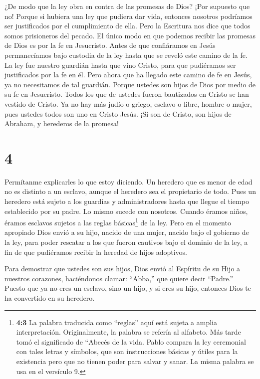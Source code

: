  ¿De modo que la ley obra en contra de las promesas de
Dios? ¡Por supuesto que no! Porque si hubiera una ley que pudiera dar
vida, entonces nosotros podríamos ser justificados por el cumplimiento
de ella.  Pero la Escritura nos dice que todos somos
prisioneros del pecado. El único modo en que podemos recibir las
promesas de Dios es por la fe en Jesucristo.  Antes de que
confiáramos en Jesús permanecíamos bajo custodia de la ley hasta que se
reveló este camino de la fe.  La ley fue nuestro guardián
hasta que vino Cristo, para que pudiéramos ser justificados por la fe en
él.  Pero ahora que ha llegado este camino de fe en Jesús,
ya no necesitamos de tal guardián.  Porque ustedes son
hijos de Dios por medio de su fe en Jesucristo.  Todos los
que de ustedes fueron bautizados en Cristo se han vestido de Cristo.
 Ya no hay más judío o griego, esclavo o libre, hombre o
mujer, pues ustedes todos son uno en Cristo Jesús.  ¡Si son
de Cristo, son hijos de Abraham, y herederos de la promesa!

\hypertarget{section-3}{%
\section{4}\label{section-3}}

 Permítanme explicarles lo que estoy diciendo. Un heredero
que es menor de edad no es distinto a un esclavo, aunque el heredero sea
el propietario de todo.  Pues un heredero está sujeto a los
guardias y administradores hasta que llegue el tiempo establecido por su
padre.  Lo mismo sucede con nosotros. Cuando éramos niños,
éramos esclavos sujetos a las reglas básicas\footnote{\textbf{4:3} La
  palabra traducida como ``reglas'' aquí está sujeta a amplia
  interpretación. Originalmente, la palabra se refería al alfabeto. Más
  tarde tomó el significado de ``Abecés de la vida. Pablo compara la ley
  ceremonial con tales letras y símbolos, que son instrucciones básicas
  y útiles para la existencia pero que no tienen poder para salvar y
  sanar. La misma palabra se usa en el versículo 9.} de la ley.
 Pero en el momento apropiado Dios envió a su hijo, nacido
de una mujer, nacido bajo el gobierno de la ley,  para poder
rescatar a los que fueron cautivos bajo el dominio de la ley, a fin de
que pudiéramos recibir la heredad de hijos adoptivos.

 Para demostrar que ustedes son sus hijos, Dios envió al
Espíritu de su Hijo a nuestros corazones, haciéndonos clamar: ``Abba,''
que quiere decir ``Padre.''  Puesto que ya no eres un
esclavo, sino un hijo, y si eres su hijo, entonces Dios te ha convertido
en su heredero.


